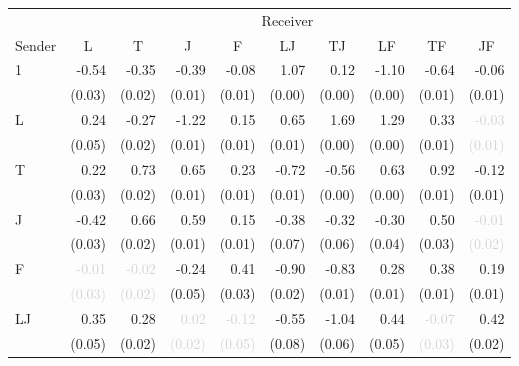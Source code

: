 \begin{tabular}{lrrrrrrrrr}
\toprule
& \multicolumn{9}{c}{Receiver} \\
\cmidrule(l){2-10} 
Sender & \multicolumn{1}{c}{L} & \multicolumn{1}{c}{T} & \multicolumn{1}{c}{J} & \multicolumn{1}{c}{F} & \multicolumn{1}{c}{LJ} & \multicolumn{1}{c}{TJ} & \multicolumn{1}{c}{LF} & \multicolumn{1}{c}{TF} & \multicolumn{1}{c}{JF} \\
\midrule
\multirow{2}{*}{1} &-0.54 &-0.35 &-0.39 &-0.08 &1.07 &0.12 &-1.10 &-0.64 &-0.06\\
 &\tiny{(0.03)} &\tiny{(0.02)} &\tiny{(0.01)} &\tiny{(0.01)} &\tiny{(0.00)} &\tiny{(0.00)} &\tiny{(0.00)} &\tiny{(0.01)} &\tiny{(0.01)}\\[1ex]
\multirow{2}{*}{L} &\cellcolor{Gray}0.24 &-0.27 &-1.22 &0.15 &0.65 &1.69 &1.29 &0.33 &\textcolor{LightGray}{-0.03}\\
 &\cellcolor{Gray}\tiny{(0.05)} &\tiny{(0.02)} &\tiny{(0.01)} &\tiny{(0.01)} &\tiny{(0.01)} &\tiny{(0.00)} &\tiny{(0.00)} &\tiny{(0.01)} &\textcolor{LightGray}{\tiny{(0.01)}}\\[1ex]
\multirow{2}{*}{T} &0.22 &\cellcolor{Gray}0.73 &0.65 &0.23 &-0.72 &-0.56 &0.63 &0.92 &-0.12\\
 &\tiny{(0.03)} &\cellcolor{Gray}\tiny{(0.02)} &\tiny{(0.01)} &\tiny{(0.01)} &\tiny{(0.01)} &\tiny{(0.00)} &\tiny{(0.00)} &\tiny{(0.01)} &\tiny{(0.01)}\\[1ex]
\multirow{2}{*}{J} &-0.42 &0.66 &\cellcolor{Gray}0.59 &0.15 &-0.38 &-0.32 &-0.30 &0.50 &\textcolor{LightGray}{-0.01}\\
 &\tiny{(0.03)} &\tiny{(0.02)} &\cellcolor{Gray}\tiny{(0.01)} &\tiny{(0.01)} &\tiny{(0.07)} &\tiny{(0.06)} &\tiny{(0.04)} &\tiny{(0.03)} &\textcolor{LightGray}{\tiny{(0.02)}}\\[1ex]
\multirow{2}{*}{F} &\textcolor{LightGray}{-0.01} &\textcolor{LightGray}{-0.02} &-0.24 &\cellcolor{Gray}0.41 &-0.90 &-0.83 &0.28 &0.38 &0.19\\
 &\textcolor{LightGray}{\tiny{(0.03)}} &\textcolor{LightGray}{\tiny{(0.02)}} &\tiny{(0.05)} &\cellcolor{Gray}\tiny{(0.03)} &\tiny{(0.02)} &\tiny{(0.01)} &\tiny{(0.01)} &\tiny{(0.01)} &\tiny{(0.01)}\\[1ex]
\multirow{2}{*}{LJ} &0.35 &0.28 &\textcolor{LightGray}{0.02} &\textcolor{LightGray}{-0.12} &\cellcolor{Gray}-0.55 &-1.04 &0.44 &\textcolor{LightGray}{-0.07} &0.42\\
 &\tiny{(0.05)} &\tiny{(0.02)} &\textcolor{LightGray}{\tiny{(0.02)}} &\textcolor{LightGray}{\tiny{(0.05)}} &\cellcolor{Gray}\tiny{(0.08)} &\tiny{(0.06)} &\tiny{(0.05)} &\textcolor{LightGray}{\tiny{(0.03)}} &\tiny{(0.02)}\\[1ex]

\end{tabular}
